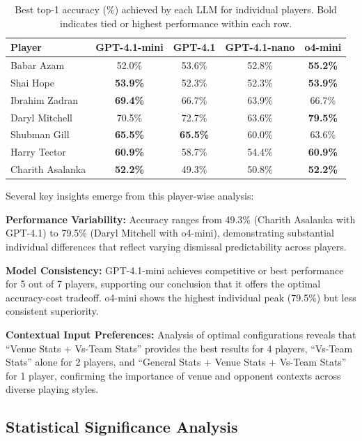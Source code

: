 \documentclass[sigconf,anonymous,review]{acmart}
\begin{document}
\begin{table}[h]
\centering
\small
\renewcommand{\arraystretch}{1.2}
\begin{tabular}{lcccc}
\toprule
\textbf{Player} & \textbf{GPT-4.1-mini} & \textbf{GPT-4.1} & \textbf{GPT-4.1-nano} & \textbf{o4-mini} \\
\midrule
Babar Azam & 52.0\% & 53.6\% & 52.8\% & \textbf{55.2\%} \\
Shai Hope & \textbf{53.9\%} & 52.3\% & 52.3\% & \textbf{53.9\%} \\
Ibrahim Zadran & \textbf{69.4\%} & 66.7\% & 63.9\% & 66.7\% \\
Daryl Mitchell & 70.5\% & 72.7\% & 63.6\% & \textbf{79.5\%} \\
Shubman Gill & \textbf{65.5\%} & \textbf{65.5\%} & 60.0\% & 63.6\% \\
Harry Tector & \textbf{60.9\%} & 58.7\% & 54.4\% & \textbf{60.9\%} \\
Charith Asalanka & \textbf{52.2\%} & 49.3\% & 50.8\% & \textbf{52.2\%} \\
\bottomrule
\end{tabular}
\caption{Best top-1 accuracy (\%) achieved by each LLM for individual players. Bold indicates tied or highest performance within each row.}
\label{tab:player-specific-results}
\end{table}

Several key insights emerge from this player-wise analysis:

\textbf{Performance Variability:} Accuracy ranges from 49.3\% (Charith Asalanka with GPT-4.1) to 79.5\% (Daryl Mitchell with o4-mini), demonstrating substantial individual differences that reflect varying dismissal predictability across players.

\textbf{Model Consistency:} GPT-4.1-mini achieves competitive or best performance for 5 out of 7 players, supporting our conclusion that it offers the optimal accuracy-cost tradeoff. o4-mini shows the highest individual peak (79.5\%) but less consistent superiority.

\textbf{Contextual Input Preferences:} Analysis of optimal configurations reveals that ``Venue Stats + Vs-Team Stats'' provides the best results for 4 players, ``Vs-Team Stats'' alone for 2 players, and ``General Stats + Venue Stats + Vs-Team Stats'' for 1 player, confirming the importance of venue and opponent contexts across diverse playing styles.

\subsection{Statistical Significance Analysis}
\label{subsec:statistical-significance}
\end{document}
